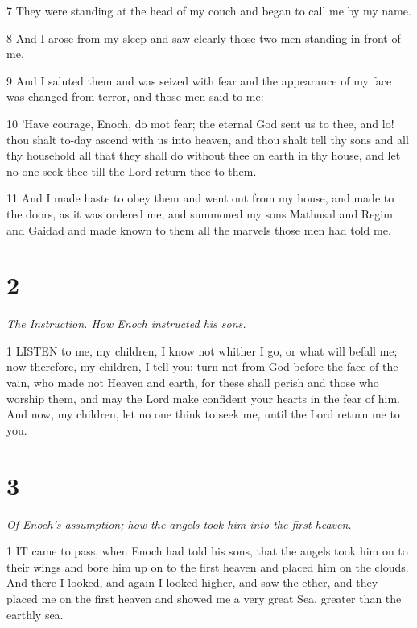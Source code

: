 \par 7 They were standing at the head of my couch and began to call me by my name.

\par 8 And I arose from my sleep and saw clearly those two men standing in front of me.

\par 9 And I saluted them and was seized with fear and the appearance of my face was changed from terror, and those men said to me:

\par 10 'Have courage, Enoch, do mot fear; the eternal God sent us to thee, and lo! thou shalt to-day ascend with us into heaven, and thou shalt tell thy sons and all thy household all that they shall do without thee on earth in thy house, and let no one seek thee till the Lord return thee to them.

\par 11 And I made haste to obey them and went out from my house, and made to the doors, as it was ordered me, and summoned my sons Mathusal and Regim and Gaidad and made known to them all the marvels those men had told me.

\chapter{2}

\par \textit{The Instruction. How Enoch instructed his sons.}

\par 1 LISTEN to me, my children, I know not whither I go, or what will befall me; now therefore, my children, I tell you: turn not from God before the face of the vain, who made not Heaven and earth, for these shall perish and those who worship them, and may the Lord make confident your hearts in the fear of him. And now, my children, let no one think to seek me, until the Lord return me to you.

\chapter{3}

\par \textit{Of Enoch's assumption; how the angels took him into the first heaven.}

\par 1 IT came to pass, when Enoch had told his sons, that the angels took him on to their wings and bore him up on to the first heaven and placed him on the clouds. And there I looked, and again I looked higher, and saw the ether, and they placed me on the first heaven and showed me a very great Sea, greater than the earthly sea.

